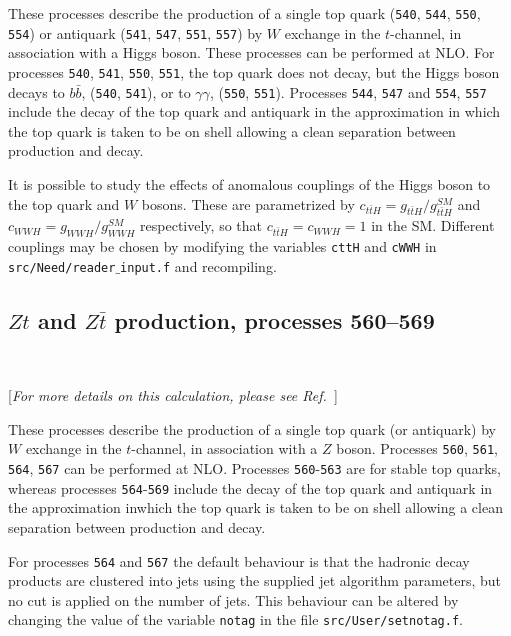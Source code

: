 \label{subsec:Ht}
These processes describe the production of a single top quark ({\tt 540}, {\tt 544}, {\tt 550},
{\tt 554}) or antiquark ({\tt 541}, {\tt 547}, {\tt 551}, {\tt 557}) by $W$ exchange in the
$t$-channel, in association with a Higgs boson. These processes can be performed at NLO.
For processes {\tt 540}, {\tt 541}, {\tt 550},
{\tt 551}, the top quark does not decay, but the
Higgs boson decays to $b\bar{b}$, ({\tt 540}, {\tt 541}), or to $\gamma \gamma$, ({\tt 550}, {\tt 551}).
Processes {\tt 544}, {\tt 547} and {\tt 554}, {\tt 557} include the decay of the top quark and antiquark
in the approximation in which the top quark is taken to be on shell allowing a clean separation
between production and decay. 

It is possible to study the effects of anomalous couplings of the Higgs boson to the top quark and $W$ bosons. These 
are parametrized by $c_{t\bar{t}H} = g_{t\bar{t}H}/g_{t\bar{t}H}^{SM}$ and $c_{WWH} = g_{WWH}/g_{WWH}^{SM}$ 
respectively, so that $c_{t\bar{t}H}=c_{WWH}=1$ in the SM. Different couplings may be chosen by modifying the variables 
{\tt cttH} and {\tt cWWH} in {\tt src/Need/reader$\_$input.f} and recompiling.

\subsection{$Zt$ and $Z\bar{t}$ production, processes 560--569}\

\begin{center}
[{\it For more details on this calculation, please see Ref.~\cite{Campbell:2013yla}}]
\end{center}

\label{subsec:Zt}
These processes describe the production of a single top quark (or antiquark) by $W$ exchange in the
$t$-channel, in association with a $Z$ boson. Processes {\tt 560}, {\tt 561},
{\tt 564}, {\tt 567} can be performed at NLO.
Processes {\tt  560}-{\tt 563} are for stable top quarks, whereas processes {\tt 564}-{\tt 569}
include the decay of the top quark and antiquark
in the approximation inwhich the top quark is taken to
be on shell allowing a clean separation
between production and decay.

For processes {\tt 564} and {\tt 567} the default behaviour is that the hadronic decay products
are clustered into jets using the supplied jet
algorithm parameters, but no cut is applied on the number of jets.
This behaviour can be altered by changing the value of the
variable {\tt notag} in the file {\tt src/User/setnotag.f}.

